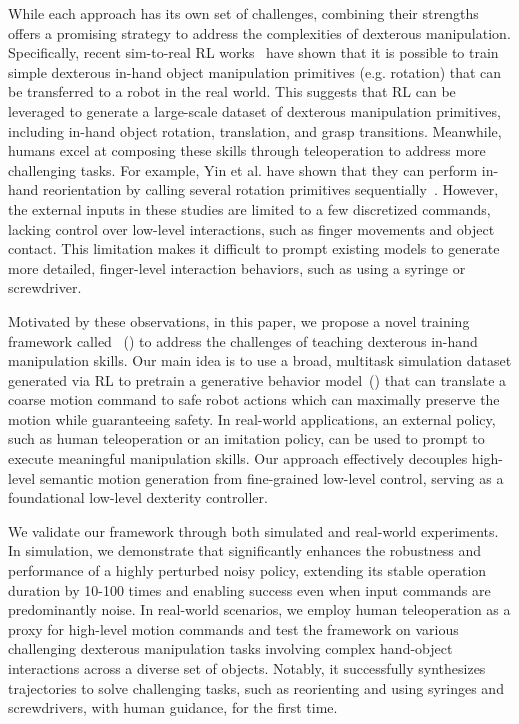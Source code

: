 While each approach has its own set of challenges, combining their strengths offers a promising strategy to address the complexities of dexterous manipulation. Specifically, recent sim-to-real RL works~\cite{qi2023hand,yin2023rotating} have shown that it is possible to train simple dexterous in-hand object manipulation primitives (e.g. rotation) that can be transferred to a robot in the real world. This suggests that RL can be leveraged to generate a large-scale dataset of dexterous manipulation primitives, including in-hand object rotation, translation, and grasp transitions. Meanwhile, humans excel at composing these skills through teleoperation to address more challenging tasks. For example, Yin et al. have shown that they can perform in-hand reorientation by calling several rotation primitives sequentially~\cite{yin2023rotating}. However, the external inputs in these studies are limited to a few discretized commands, lacking control over low-level interactions, such as finger movements and object contact. This limitation makes it difficult to prompt existing models to generate more detailed, finger-level interaction behaviors, such as using a syringe or screwdriver. 

Motivated by these observations, in this paper, we propose a novel training framework called \mnamefull{}~(\mname{}) to address the challenges of teaching dexterous in-hand manipulation skills. Our main idea is to use a broad, multitask simulation dataset generated via RL to pretrain a generative behavior model~(\mname) that can translate a coarse motion command to safe robot actions which can maximally preserve the motion while guaranteeing safety. In real-world applications, an external policy, such as human teleoperation or an imitation policy, can be used to prompt \mname{} to execute meaningful manipulation skills. Our approach effectively decouples high-level semantic motion generation from fine-grained low-level control, serving as a foundational low-level dexterity controller.

We validate our \mname{} framework through both simulated and real-world experiments. In simulation, we demonstrate that \mname{} significantly enhances the robustness and performance of a highly perturbed noisy policy, extending its stable operation duration by 10-100 times and enabling success even when input commands are predominantly noise. In real-world scenarios, we employ human teleoperation as a proxy for high-level motion commands and test the framework on various challenging dexterous manipulation tasks involving complex hand-object interactions across a diverse set of objects. Notably, it successfully synthesizes trajectories to solve challenging tasks, such as reorienting and using syringes and screwdrivers, with human guidance, for the first time.


